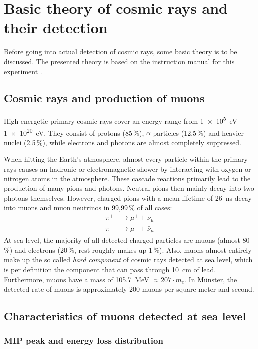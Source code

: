 \section{Basic theory of cosmic rays and their detection}
	
	Before going into actual detection of cosmic rays, some basic theory is to be discussed. The presented theory is based on the instruction manual for this experiment \cite{wwu}.
	

\subsection{Cosmic rays and production of muons}

High-energetic primary cosmic rays cover an energy range from \SIrange{1e5}{1e20}{\electronvolt}.
They consist of protons (85\,\%), $\alpha$-particles (12.5\,\%) and heavier nuclei (2.5\,\%), while electrons and photons are almost completely suppressed.

When hitting the Earth's atmosphere, almost every particle within the primary rays causes an hadronic or electromagnetic shower by interacting with oxygen or nitrogen atoms in the atmosphere.
These cascade reactions primarily lead to the production of many pions and photons.
Neutral pions then mainly decay into two photons themselves.
However, charged pions with a mean lifetime of \SI{26}{\nano\second} \cite{pdg} decay into muons and muon neutrinos in 99,99\,\% of all cases:
\begin{align}
	\pi^+&\longrightarrow \mu^++\nu_\mu\\
	\pi^-&\longrightarrow \mu^-+\bar{\nu}_\mu
\end{align}
At sea level, the majority of all detected charged particles are muons (almost 80\,\%) and electrons (20\,\%, rest roughly makes up 1\,\%).
Also, muons almost entirely make up the so called \emph{hard component} of cosmic rays detected at sea level, which is per definition the component that can pass through \SI{10}{\centi\meter} of lead.
Furthermore, muons have a mass of \SI{105.7}{\mega\electronvolt} $\approx 207 \cdot m_e$.
In Münster, the detected rate of muons is approximately 200 muons per square meter and second.

\subsection{Characteristics of muons detected at sea level}

\subsubsection{MIP peak and energy loss distribution}


